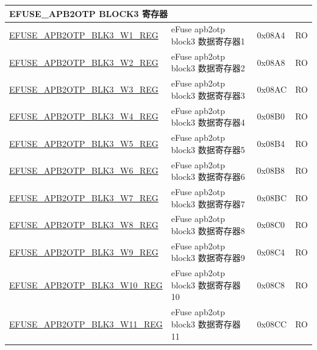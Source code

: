 \begin{longtable}{ | p{7cm} | p{6cm} | p{1.2cm} | p{1.5cm} | }
\multicolumn{4}{|l|}{\textbf{EFUSE\_APB2OTP BLOCK3 寄存器}} \\ \hline
\hyperref[regdesc:EFUSEAPB2OTPBLK3WNREG]{EFUSE\_APB2OTP\_BLK3\_W1\_REG} & eFuse apb2otp block3 数据寄存器1 & 0x08A4 & RO \\\hline
\hyperref[regdesc:EFUSEAPB2OTPBLK3WNREG]{EFUSE\_APB2OTP\_BLK3\_W2\_REG} & eFuse apb2otp block3 数据寄存器2 & 0x08A8 & RO \\\hline
\hyperref[regdesc:EFUSEAPB2OTPBLK3WNREG]{EFUSE\_APB2OTP\_BLK3\_W3\_REG} & eFuse apb2otp block3 数据寄存器3 & 0x08AC & RO \\\hline
\hyperref[regdesc:EFUSEAPB2OTPBLK3WNREG]{EFUSE\_APB2OTP\_BLK3\_W4\_REG} & eFuse apb2otp block3 数据寄存器4 & 0x08B0 & RO \\\hline
\hyperref[regdesc:EFUSEAPB2OTPBLK3WNREG]{EFUSE\_APB2OTP\_BLK3\_W5\_REG} & eFuse apb2otp block3 数据寄存器5 & 0x08B4 & RO \\\hline
\hyperref[regdesc:EFUSEAPB2OTPBLK3WNREG]{EFUSE\_APB2OTP\_BLK3\_W6\_REG} & eFuse apb2otp block3 数据寄存器6 & 0x08B8 & RO \\\hline
\hyperref[regdesc:EFUSEAPB2OTPBLK3WNREG]{EFUSE\_APB2OTP\_BLK3\_W7\_REG} & eFuse apb2otp block3 数据寄存器7 & 0x08BC & RO \\\hline
\hyperref[regdesc:EFUSEAPB2OTPBLK3WNREG]{EFUSE\_APB2OTP\_BLK3\_W8\_REG} & eFuse apb2otp block3 数据寄存器8 & 0x08C0 & RO \\\hline
\hyperref[regdesc:EFUSEAPB2OTPBLK3WNREG]{EFUSE\_APB2OTP\_BLK3\_W9\_REG} & eFuse apb2otp block3 数据寄存器9 & 0x08C4 & RO \\\hline
\hyperref[regdesc:EFUSEAPB2OTPBLK3WNREG]{EFUSE\_APB2OTP\_BLK3\_W10\_REG} & eFuse apb2otp block3 数据寄存器10 & 0x08C8 & RO \\\hline
\hyperref[regdesc:EFUSEAPB2OTPBLK3WNREG]{EFUSE\_APB2OTP\_BLK3\_W11\_REG} & eFuse apb2otp block3 数据寄存器11 & 0x08CC & RO \\\hline


\end{longtable}
